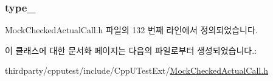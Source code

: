 \subsubsection[{\texorpdfstring{type\+\_\+}{type_}}]{ type\+\_\+}\hypertarget{class_mock_checked_actual_call_1_1_mock_output_parameters_list_node_ad41f1c1c681fbfc6ba0ef62ac34ac075}{}\label{class_mock_checked_actual_call_1_1_mock_output_parameters_list_node_ad41f1c1c681fbfc6ba0ef62ac34ac075}


Mock\+Checked\+Actual\+Call.\+h 파일의 132 번째 라인에서 정의되었습니다.



이 클래스에 대한 문서화 페이지는 다음의 파일로부터 생성되었습니다.\+:\begin{DoxyCompactItemize}
\item 
thirdparty/cpputest/include/\+Cpp\+U\+Test\+Ext/\hyperlink{_mock_checked_actual_call_8h}{Mock\+Checked\+Actual\+Call.\+h}\end{DoxyCompactItemize}
